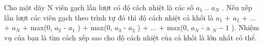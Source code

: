 Cho một dãy N viên gạch lần lượt có độ cách nhiệt là các số $a_{1}$   .. $a_{N}$   . Nếu xếp lần lượt các viên gạch theo trình tự đó thì độ cách nhiệt cả khối là $a_{1}$   + $a_{2}$   + ... + $a_{N}$   + max(0, $a_{2}$   - $a_{1}$   ) + max(0, $a_{3}$   - $a_{2}$   ) + ... + max(0, $a_{N}$   - a   $_    N - 1   $   ). Nhiệm vụ của bạn là tìm cách xếp sao cho độ cách nhiệt của cả khối là lớn nhất có thể.